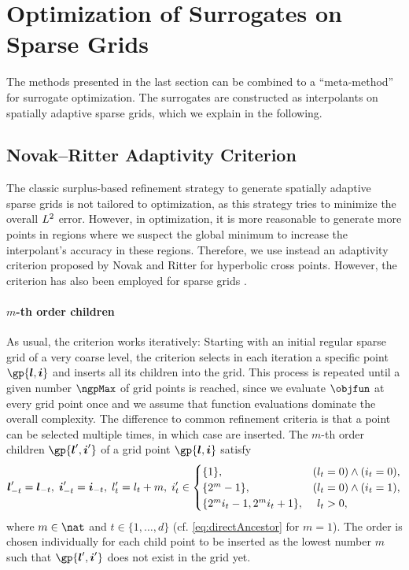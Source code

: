 \section{Optimization of Surrogates on Sparse Grids}
\label{sec:52method}

The methods presented in the last section can be combined to a
``meta-method'' for surrogate optimization.
The surrogates are constructed as interpolants on spatially adaptive
sparse grids, which we explain in the following.



\subsection{Novak--Ritter Adaptivity Criterion}
\label{sec:521novakRitter}

The classic surplus-based refinement strategy to generate
spatially adaptive sparse grids is not tailored to optimization,
as this strategy tries to minimize the overall $L^2$ error.
However, in optimization, it is more reasonable to generate more
points in regions where we suspect the global minimum
to increase the interpolant's accuracy in these regions.
Therefore, we use instead an adaptivity criterion proposed by
Novak and Ritter \cite{Novak96Global} for hyperbolic cross points.
However, the criterion has also been employed for sparse grids
.

\paragraph{$m$-th order children}

As usual, the criterion works iteratively:
Starting with an initial regular sparse grid of a very coarse level,
the criterion selects in each iteration a specific point $\gp{\*l,\*i}$
and inserts all its children into the grid.
This process is repeated until a given number $\ngpMax$ of grid points is
reached,
since we evaluate $\objfun$ at every grid point once and we assume that
function evaluations dominate the overall complexity.
The difference to common refinement criteria is that
a point can be selected multiple times, in which case
 are inserted.
The $m$-th order children $\gp{\*l',\*i'}$ of a grid point $\gp{\*l,\*i}$
satisfy
\begin{equation}
  \label{eq:indirectChild}
  {\boldsymbol{l}}'_{-t} = {\boldsymbol{l}}_{-t},\;
  {\boldsymbol{i}}'_{-t} = {\boldsymbol{i}}_{-t},\;
  l'_t = l_t + m,\;
  i'_t \in
  \begin{cases}
    \{1\},&(l_t = 0) \land (i_t = 0),\\
    \{2^m - 1\},&(l_t = 0) \land (i_t = 1),\\
    \{2^m i_t - 1, 2^m i_t + 1\},&\hphantom{(}l_t > 0,
  \end{cases}
\end{equation}
where $m \in \nat$ and $t \in \{1, \dotsc, d\}$
(cf. \eqref{eq:directAncestor} for $m = 1$).
The order is chosen individually for each child point to be inserted
as the lowest number $m$ such that $\gp{\*l',\*i'}$ does not exist
in the grid yet.

